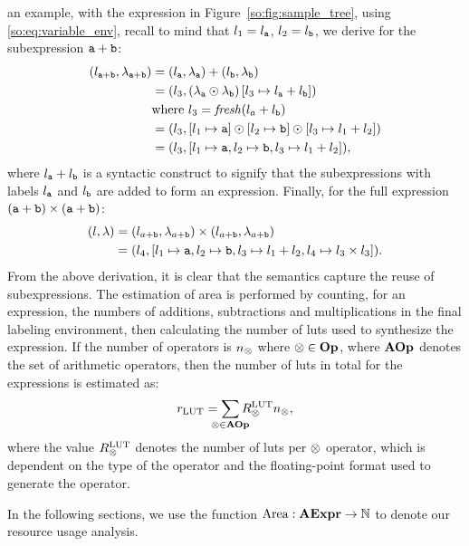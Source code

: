 an example, with the expression in Figure~\ref{so:fig:sample_tree}, using
\eqref{so:eq:variable_env}, recall to mind that $l_1 = l_{\texttt{a}}$, $l_2 =
l_{\texttt{b}}$, we derive for the subexpression $\texttt{a} + \texttt{b}$:
\begin{equation}
    \begin{aligned}
        (l_{\texttt{a} + \texttt{b}}, \lambda_{\texttt{a} + \texttt{b}})
            &= (l_{\texttt{a}}, \lambda_{\texttt{a}}) + (l_{\texttt{b}}, \lambda_{\texttt{b}}) \\
            &= \left(l_3,
                \left( \lambda_{\texttt{a}} \odot \lambda_{\texttt{b}} \right)
                    \left[ l_3\mapsto{l_{\texttt{a}}+ l_{\texttt{b}}} \right]
               \right) \\
            &  \text{where~} l_3 = \operatorname{\mathit{fresh}}(l_a + l_{\texttt{b}}) \\
            &= (l_3, [l_1\mapsto{\texttt{a}}]\odot
                     [l_2\mapsto{\texttt{b}}]\odot
                     [l_3\mapsto{l_1 + l_2}]) \\
            &= (l_3, [
                 l_1\mapsto{\texttt{a}},
                 l_2\mapsto{\texttt{b}},
                 l_3\mapsto{l_1 + l_2}
               ]),
    \end{aligned}
\end{equation}
where $l_{\texttt{a}} + l_{\texttt{b}}$ is a syntactic construct to signify that the
subexpressions with labels $l_{\texttt{a}}$ and $l_{\texttt{b}}$ are added to form an
expression.
Finally, for the full expression $(\texttt{a} + \texttt{b}) \times (\texttt{a} + \texttt{b})$:
\begin{equation}
    \begin{aligned}
        (l, \lambda)
            &= (l_{a + \texttt{b}}, \lambda_{a + \texttt{b}}) \times
               (l_{a + \texttt{b}}, \lambda_{a + \texttt{b}}) \\
            &= (l_4, [l_1\mapsto{\texttt{a}}, l_2\mapsto{\texttt{b}},
                      l_3\mapsto{l_1 + l_2}, l_4\mapsto{l_3 \times l_3}]).
    \end{aligned}
\end{equation}
From the above derivation, it is clear that the semantics capture the reuse
of subexpressions. The estimation of area is performed by counting, for an
expression, the numbers of additions, subtractions and multiplications in the
final labeling environment, then calculating the number of \glspl{lut} used
to synthesize the expression. If the number of operators is $n_\otimes$
where $\otimes \in \mathbf{Op}$, where $\mathbf{AOp}$ denotes the set of arithmetic
operators, then the number of \glspl{lut} in total for the expressions is
estimated as:
\begin{equation}
    r_\mathrm{LUT} = \sum_{\mathclap{\opsymbol\in\aopset}}
        R^\mathrm{LUT}_\opsymbol n_\opsymbol,
\end{equation}
where the value $R^\mathrm{LUT}_\otimes$ denotes the number of \glspl{lut}
per $\otimes$ operator, which is dependent on the type of the operator and
the floating-point format used to generate the operator.

In the following sections, we use the function $\operatorname{\mathrm{Area}}: \mathbf{AExpr}\to\mathbb{N}$
to denote our resource usage analysis.
